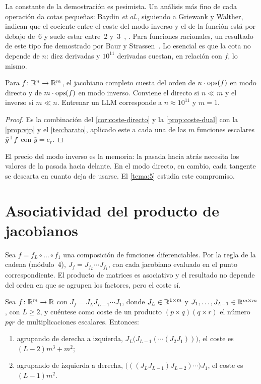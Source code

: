 La constante de la demostración es pesimista. Un análisis más fino de cada operación da cotas pequeñas: Baydin \emph{et al.}, siguiendo a Griewank y Walther, indican que el cociente entre el coste del modo inverso y el de la función está por debajo de~6 y suele estar entre~2 y~3~\cite[§3.2]{baydin}, \cite[cap.~4]{gw}. Para funciones racionales, un resultado de este tipo fue demostrado por Baur y Strassen~\cite{baurstrassen}. Lo esencial es que la cota no depende de $n$: diez derivadas y $10^{11}$ derivadas cuestan, en relación con $f$, lo mismo.

\begin{corolario}\label{cor:eleccion}
Para $f\colon\mathbb{R}^{n}\to\mathbb{R}^{m}$, el jacobiano completo cuesta del orden de $n\cdot\operatorname{ops}(f)$ en modo directo y de $m\cdot\operatorname{ops}(f)$ en modo inverso. Conviene el directo si $n\ll m$ y el inverso si $m\ll n$. Entrenar un LLM corresponde a $n\approx 10^{11}$ y $m=1$.
\end{corolario}

\begin{proof}
Es la combinación del \cref{cor:coste-directo} y la \cref{prop:coste-dual} con la \cref{prop:vjp} y el \cref{teo:barato}, aplicado este a cada una de las $m$ funciones escalares $\bar y^{\top} f$ con $\bar y=e_r$.
\end{proof}

El precio del modo inverso es la memoria: la pasada hacia atrás necesita los valores de la pasada hacia delante. En el modo directo, en cambio, cada tangente se descarta en cuanto deja de usarse. El \cref{tema:5} estudia este compromiso.

\section{Asociatividad del producto de jacobianos}

Sea $f=f_L\circ\dots\circ f_1$ una composición de funciones diferenciables. Por la regla de la cadena (módulo~4), $J_f=J_{f_L}\cdots J_{f_1}$, con cada jacobiano evaluado en el punto correspondiente. El producto de matrices es asociativo y el resultado no depende del orden en que se agrupen los factores, pero el coste sí.

\begin{proposicion}\label{prop:asociatividad}
Sea $f\colon\mathbb{R}^{m}\to\mathbb{R}$ con $J_f=J_L J_{L-1}\cdots J_1$, donde $J_L\in\mathbb{R}^{1\times m}$ y $J_1,\dots,J_{L-1}\in\mathbb{R}^{m\times m}$, con $L\ge 2$, y cuéntese como coste de un producto $(p\times q)(q\times r)$ el número $pqr$ de multiplicaciones escalares. Entonces:
\begin{enumerate}
  \item agrupando de derecha a izquierda, $J_L\bigl(J_{L-1}(\cdots(J_2J_1))\bigr)$, el coste es $(L-2)m^{3}+m^{2}$;
  \item agrupando de izquierda a derecha, $\bigl(((J_LJ_{L-1})J_{L-2})\cdots\bigr)J_1$, el coste es $(L-1)m^{2}$.
\end{enumerate}
\end{proposicion}

